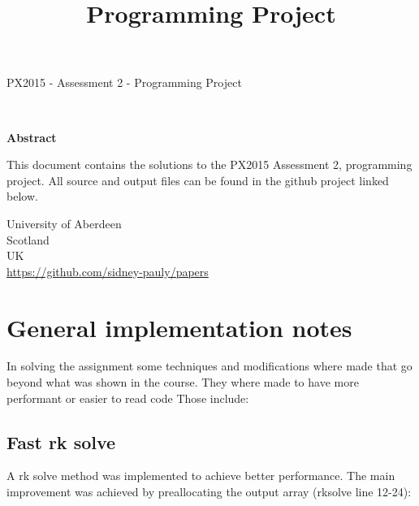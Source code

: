 \documentclass[14pt]{article}
\begin{document}
\title{Programming Project}
\date{}




\fancyhf{}



\begin{titlepage}
  \begin{center}
    \Large
    \textbf{\thetitle}
        
    \vspace{0.4cm}
    \large
    PX2015 - Assessment 2 - Programming Project
        
    \vspace{0.4cm}
    \textbf{\theauthor}\\
    \textbf{\theuoastudentid}

       
    \vspace{0.9cm}
    \textbf{Abstract}
  \end{center}
  This document contains the solutions to the PX2015 Assessment 2, programming project.
  All source and output files can be found in the github project linked below.

  \vfill

  \begin{center}

    University of Aberdeen\\
    Scotland\\
    UK\\
    \thedate
    \vspace{0.4cm}
    \url{https://github.com/sidney-pauly/papers}
  \end{center}
\end{titlepage}

\section{General implementation notes}
In solving the assignment some techniques and modifications where made that go beyond what was shown in the course. They where made to have more performant or easier to read code
Those include:

\subsection{Fast rk solve}
A rk solve method was implemented to achieve better performance. The main improvement was achieved by preallocating the output array (rksolve line 12-24):
\inputminted[linenos, firstline=12, lastline=24]{octave}{./matlab/rksolve.m}
\end{document}
